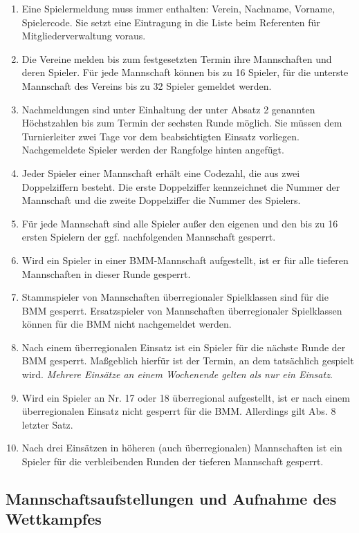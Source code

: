 \documentclass[fontsize=12pt, paper=a4, ngerman]{article}
\begin{document}
\begin{enumerate}
\item Eine Spielermeldung muss immer enthalten: Verein, Nachname, Vorname, Spielercode. Sie setzt eine Eintragung in die Liste beim Referenten für Mitgliederverwaltung voraus.
\item Die Vereine melden bis zum festgesetzten Termin ihre Mannschaften und deren Spieler. Für jede Mannschaft können bis zu 16 Spieler, für die unterste Mannschaft des Vereins
bis zu 32 Spieler gemeldet werden.
\item Nachmeldungen sind unter Einhaltung der unter Absatz 2 genannten Höchstzahlen bis zum Termin der sechsten Runde möglich.
Sie müssen dem Turnierleiter zwei Tage vor dem beabsichtigten Einsatz vorliegen. Nachgemeldete Spieler werden der Rangfolge hinten angefügt.
\item Jeder Spieler einer Mannschaft erhält eine Codezahl, die aus zwei Doppelziffern besteht. Die erste Doppelziffer kennzeichnet die Nummer der Mannschaft
und die zweite Doppelziffer die Nummer des Spielers.
\item Für jede Mannschaft sind alle Spieler außer den eigenen und den bis zu 16 ersten Spielern der ggf. nachfolgenden Mannschaft gesperrt.
\item Wird ein Spieler in einer BMM-Mannschaft aufgestellt, ist er für alle tieferen Mannschaften in dieser Runde gesperrt.
\item Stammspieler von Mannschaften überregionaler Spielklassen sind für die BMM gesperrt. Ersatzspieler von Mannschaften überregionaler Spielklassen können für die BMM nicht
nachgemeldet werden.
\item Nach einem überregionalen Einsatz ist ein Spieler für die nächste Runde der BMM gesperrt. Maßgeblich hierfür ist der Termin, an dem tatsächlich gespielt wird. 
\emph{Mehrere Einsätze an einem Wochenende gelten als nur ein Einsatz}. 
\item Wird ein Spieler an Nr. 17 oder 18 überregional aufgestellt, ist er nach einem überregionalen Einsatz nicht gesperrt für die BMM. Allerdings gilt Abs. 8 letzter Satz.
\item Nach drei Einsätzen in höheren (auch überregionalen) Mannschaften ist ein Spieler für die verbleibenden Runden der tieferen Mannschaft gesperrt.
\end{enumerate}

\subsection{Mannschaftsaufstellungen und Aufnahme des Wettkampfes}
\end{document}
